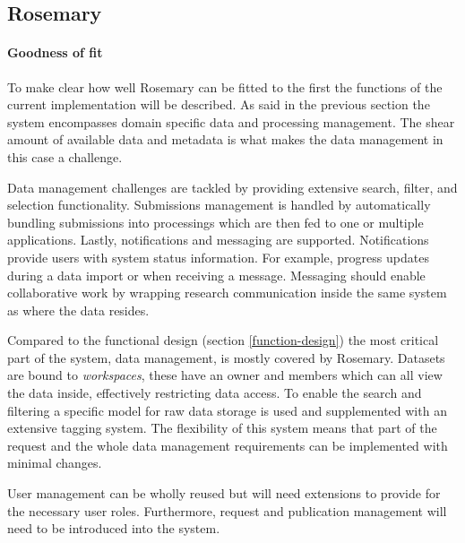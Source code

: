 \subsection{Rosemary}
\label{reuse-rosemary}

\paragraph{Goodness of fit}
To make clear how well Rosemary can be fitted to the \project{} first the functions of the current implementation will be described.
As said in the previous section the system encompasses domain specific data and processing management.
The shear amount of available data and metadata is what makes the data management in this case a challenge.

Data management challenges are tackled by providing extensive search, filter, and selection functionality.
Submissions management is handled by automatically bundling submissions into processings which are then fed to one or multiple applications.
Lastly, notifications and messaging are supported.
Notifications provide users with system status information. 
For example, progress updates during a data import or when receiving a message.
Messaging should enable collaborative work by wrapping research communication inside the same system as where the data resides.

Compared to the functional design (section \ref{function-design}) the most critical part of the system, data management, is mostly covered by Rosemary.
Datasets are bound to \emph{workspaces}, these have an owner and members which can all view the data inside, effectively restricting data access.
To enable the search and filtering a specific model for raw data storage is used and supplemented with an extensive tagging system.
The flexibility of this system means that part of the request and the whole data management requirements can be implemented with minimal changes.

User management can be wholly reused but will need extensions to provide for the necessary user roles.
Furthermore, request and publication management will need to be introduced into the system.

